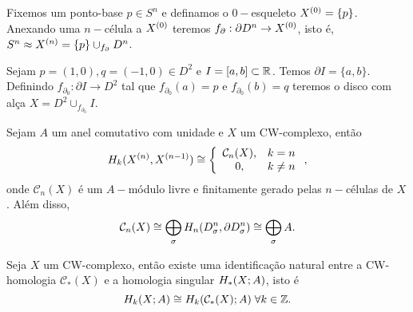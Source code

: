 \documentclass{beamer}
\begin{document}
	
	\begin{frame}
		\begin{exemplo}[n-esfera]
			Fixemos um ponto-base $p \in S^{n}$ e definamos o $0-$esqueleto $X^{(0)}=\{p\}$. Anexando uma $n-$célula a $X^{(0)}$ teremos $f_{\partial}: \partial D^{n} \to X^{(0)}$, isto é, $S^{n} \approx X^{(n)} = \{p\}\cup_{f_{\partial}} D^{n}_{}$.
		\end{exemplo}
		
		\pause
		\begin{exemplo}
			Sejam $p=(1,0), q=(-1,0) \in D^{2}$ e $I=[a,b] \subset \mathbb{R}^{}$. Temos $\partial I=\{a,b\}$. Definindo $f_{\partial_{0}}: \partial I \to D^{2}$ tal que $f_{\partial_{0}}(a)=p$ e $f_{\partial_{0}}(b)=q$ teremos o disco com alça $X=D^{2}\cup_{f_{\partial_{0}}}I$.   
		\end{exemplo}
	\end{frame}
	
	\begin{frame}
		
		\begin{lema}
		 	Sejam $A$ um anel comutativo com unidade e $X$ um CW-complexo, então
			$$
			H_{k}(X^{(n)}, X^{(n-1)}) \cong 
			\left\{
			\begin{array}{cc}
			\mathcal{C}_{n}(X), & k = n\\
			0, & k\neq n\\
			\end{array}
			\right.,
			$$
			onde $\mathcal{C}_{n}(X)$ é um $A-$módulo livre e finitamente gerado pelas $n-$células de $X$. Além disso,
			$$
			\mathcal{C}_{n}(X) \cong \bigoplus \limits_{\sigma} H_{n}(D^{n}_{\sigma}, \partial D^{n}_{\sigma}) \cong \bigoplus \limits_{\sigma} A.
			$$
			
		\end{lema}
		
	\end{frame}
	
	
	\begin{frame}
		
		
		\begin{teorema}[CW-homologia]
			Seja $X$ um CW-complexo, então existe uma identificação natural entre a CW-homologia $\mathcal{C}_{*}(X)$ e a homologia singular $H_{*}(X;A)$, isto é 
			$$
			H_{k}(X;A) \cong H_{k}(\mathcal{C}_{*}(X);A)\; \forall k \in \mathbb{Z}.
			$$
		\end{teorema}
	\end{frame}
	
\end{document}
